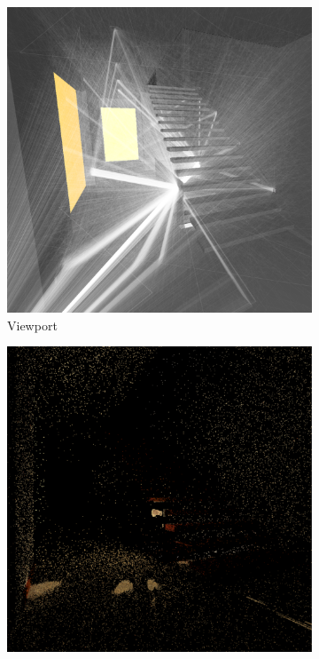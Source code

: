 \begin{figure}
	\centering
	\begin{subfigure}[t]{0.32\linewidth}
		\includegraphics[width=\textwidth]{chapters/chapter_results/b_paths1}
		\caption{Viewport}
		\label{b_paths1}
	\end{subfigure}
	\begin{subfigure}[t]{0.32\linewidth}
		\includegraphics[width=\textwidth]{chapters/chapter_results/b_image1}

\end{subfigure}
\end{figure}
